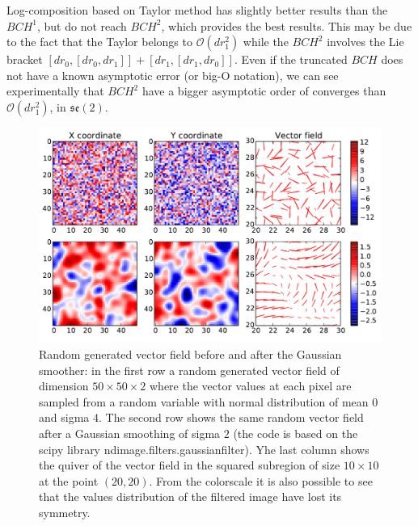 Log-composition based on Taylor method has slightly better results than the $BCH^1$, but do not reach $BCH^2$, which provides the best results. This may be due to the fact that the Taylor belongs to $\mathcal{O}(dr_1^2)$ while the $BCH^2$ involves the Lie bracket $[dr_0,[dr_0, dr_1]] + [dr_1,[dr_1, dr_0]]$. Even if the truncated $BCH$ does not have a known asymptotic error (or big-O notation), we can see experimentally that $BCH^2$ have a bigger asymptotic order of converges than $\mathcal{O}(dr_1^2)$, in $\mathfrak{se}(2)$.
%
\begin{figure}[!ht]
	\includegraphics[scale=0.70]{figures/svf_gaussian_smoothing_effects.pdf}
	\caption{Random generated vector field before and after the Gaussian smoother: in the first row a random generated vector field of dimension $50\times 50 \times 2$ where the vector values at each pixel are sampled from a random variable with normal distribution of mean $0$ and sigma $4$. The second row shows the same random vector field after a Gaussian smoothing of sigma $2$ (the code is based on the scipy library ndimage.filters.gaussian\textunderscore filter). Yhe last column shows the quiver of the vector field in the squared subregion of size $10\times 10$ at the point $(20,20)$. From the colorscale it is also possible to see that the values distribution of the filtered image have lost its symmetry. }
	\label{fig:SVF_gaussian_smoothing_effects}
\end{figure}

